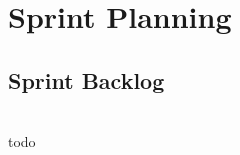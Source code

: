 \chapter{Sprint Planning}

\section{Sprint Backlog}\label{plan2}

\begin{description}[style=unboxed]
    \item[{[}\phigh{]} todo - todo] \hfill \\ 
        todo
\end{description}
